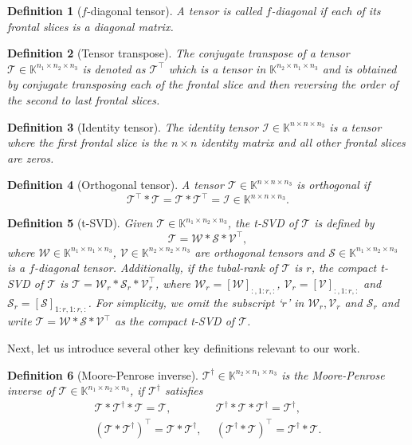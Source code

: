 \documentclass[twoside,12pt]{article}
\newtheorem{definition}{Definition}
\begin{document}
\begin{definition}[$f$-diagonal tensor]\rm
A tensor is called $f$-diagonal if each of its frontal slices is a diagonal matrix.\end{definition}
\begin{definition} [Tensor transpose]\rm The conjugate transpose of a tensor $\mathcal{T}\in\mathbb{K}^{n_1\times n_2\times n_3}$ is denoted as $\mathcal{T}^\top$  which is a tensor in  $\mathbb{K}^{n_2\times n_1\times n_3}$ and is obtained by conjugate transposing each of the frontal slice and then reversing the order of the second to last frontal slices. 
\end{definition} 
\begin{definition}[Identity tensor]\label{def:identity}\rm
 The identity tensor $\mathcal{I}\in \mathbb{K}^{n\times n\times n_3}$ is a tensor where the first frontal slice is the  
$n\times n$ identity matrix and all other frontal slices are zeros.
\end{definition}
\begin{definition}[Orthogonal tensor]\rm
 A tensor $\mathcal{T}\in  \mathbb{K}^{n\times n \times n_3}$ is orthogonal if \[\mathcal{T}^{\top}*\mathcal{T} =   \mathcal{T}*\mathcal{T}^{\top} = \mathcal{I} \in \mathbb{K}^{n\times n\times n_3}.\] 
\end{definition}
\begin{definition}[t-SVD] 
 Given $\mathcal{T} \in \mathbb{K}^{n_1 \times n_2 \times n_3}$, the t-SVD of $\mathcal{T}$ is defined by  
\[
\mathcal{T}=\mathcal{W} * \mathcal{S} * \mathcal{V}^{\top}, 
\] 
where $\mathcal{W} \in \mathbb{K}^{n_1 \times n_1 \times n_3}$, $\mathcal{V} \in \mathbb{K}^{n_2 \times n_2 \times n_3}$ are orthogonal tensors and $\mathcal{S} \in \mathbb{K}^{n_1 \times n_2 \times n_3}$ is a $f$-diagonal tensor. Additionally, if the tubal-rank of $\mathcal{T}$ is $r$, the compact t-SVD of $\mathcal{T}$ is $\mathcal{T}=\mathcal{W}_r * \mathcal{S}_r * \mathcal{V}_r^{\top}$, 
where $\mathcal{W}_r=[\mathcal{W}]_{:,1:r,:}$, $\mathcal{V}_r=[\mathcal{V}]_{:,1:r,:}$ and $\mathcal{S}_r=[\mathcal{S}]_{1:r,1:r,:}$. For simplicity, we omit the subscript `$r$' in $\mathcal{W}_r,\mathcal{V}_r$ and $\mathcal{S}_r$  and write $\mathcal{T}=\mathcal{W}*\mathcal{S}*\mathcal{V}^\top$ as the compact t-SVD of $\mathcal{T}$. 
\end{definition}
Next, let us introduce several other key definitions relevant to our work.
\begin{definition}[Moore-Penrose inverse]
$\mathcal{T}^{\dagger} \in \mathbb{K}^{n_2 \times n_1 \times n_3}$ is  the Moore-Penrose inverse of $\mathcal{T} \in \mathbb{K}^{n_1 \times n_2 \times n_3}$, if $\mathcal{T}^{\dagger}$ satisfies 
\begin{align*}
\mathcal{T} \ast \mathcal{T}^{\dagger}\ast \mathcal{T} =\mathcal{T},~&~  \mathcal{T}^{\dagger} \ast  \mathcal{T} \ast \mathcal{T}^{\dagger}=\mathcal{T}^{\dagger},\\
 \left(\mathcal{T} \ast  \mathcal{T}^{\dagger}\right)^{\top}=\mathcal{T} \ast  \mathcal{T}^{\dagger},~&~
\left(\mathcal{T}^{\dagger} \ast  \mathcal{T}\right)^{\top}  =\mathcal{T}^{\dagger} \ast  \mathcal{T} .
\end{align*}
\end{definition}
\end{document}
